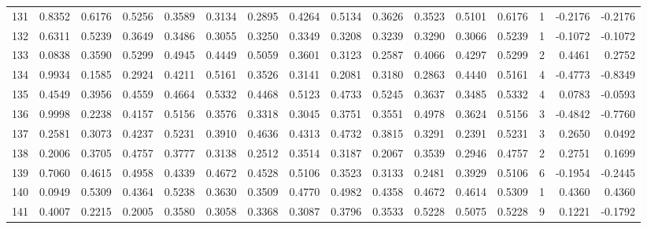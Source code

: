 \begin{tabular}{lrrrrrrrrrrrrrrr}
131 &      0.8352 &  0.6176 &  0.5256 &  0.3589 &  0.3134 &  0.2895 &  0.4264 &  0.5134 &  0.3626 &  0.3523 &   0.5101 &     0.6176 &      1 &                   -0.2176 &                    -0.2176 \\
132 &      0.6311 &  0.5239 &  0.3649 &  0.3486 &  0.3055 &  0.3250 &  0.3349 &  0.3208 &  0.3239 &  0.3290 &   0.3066 &     0.5239 &      1 &                   -0.1072 &                    -0.1072 \\
133 &      0.0838 &  0.3590 &  0.5299 &  0.4945 &  0.4449 &  0.5059 &  0.3601 &  0.3123 &  0.2587 &  0.4066 &   0.4297 &     0.5299 &      2 &                    0.4461 &                     0.2752 \\
134 &      0.9934 &  0.1585 &  0.2924 &  0.4211 &  0.5161 &  0.3526 &  0.3141 &  0.2081 &  0.3180 &  0.2863 &   0.4440 &     0.5161 &      4 &                   -0.4773 &                    -0.8349 \\
135 &      0.4549 &  0.3956 &  0.4559 &  0.4664 &  0.5332 &  0.4468 &  0.5123 &  0.4733 &  0.5245 &  0.3637 &   0.3485 &     0.5332 &      4 &                    0.0783 &                    -0.0593 \\
136 &      0.9998 &  0.2238 &  0.4157 &  0.5156 &  0.3576 &  0.3318 &  0.3045 &  0.3751 &  0.3551 &  0.4978 &   0.3624 &     0.5156 &      3 &                   -0.4842 &                    -0.7760 \\
137 &      0.2581 &  0.3073 &  0.4237 &  0.5231 &  0.3910 &  0.4636 &  0.4313 &  0.4732 &  0.3815 &  0.3291 &   0.2391 &     0.5231 &      3 &                    0.2650 &                     0.0492 \\
138 &      0.2006 &  0.3705 &  0.4757 &  0.3777 &  0.3138 &  0.2512 &  0.3514 &  0.3187 &  0.2067 &  0.3539 &   0.2946 &     0.4757 &      2 &                    0.2751 &                     0.1699 \\
139 &      0.7060 &  0.4615 &  0.4958 &  0.4339 &  0.4672 &  0.4528 &  0.5106 &  0.3523 &  0.3133 &  0.2481 &   0.3929 &     0.5106 &      6 &                   -0.1954 &                    -0.2445 \\
140 &      0.0949 &  0.5309 &  0.4364 &  0.5238 &  0.3630 &  0.3509 &  0.4770 &  0.4982 &  0.4358 &  0.4672 &   0.4614 &     0.5309 &      1 &                    0.4360 &                     0.4360 \\
141 &      0.4007 &  0.2215 &  0.2005 &  0.3580 &  0.3058 &  0.3368 &  0.3087 &  0.3796 &  0.3533 &  0.5228 &   0.5075 &     0.5228 &      9 &                    0.1221 &                    -0.1792 \\

\end{tabular}
